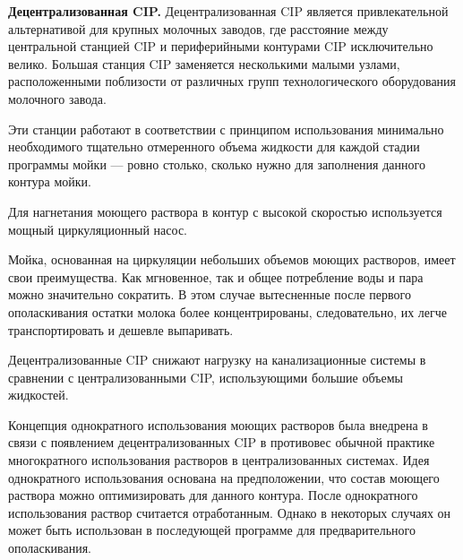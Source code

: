 {\par \redline \textbf{Децентрализованная CIP.} Децентрализованная CIP является привлекательной альтернативой для крупных молочных заводов, где расстояние между центральной станцией CIP и периферийными контурами CIP исключительно велико. Большая станция CIP заменяется несколькими малыми узлами, расположенными поблизости от различных групп технологического оборудования молочного завода.

\par \redline Эти станции работают в соответствии с принципом использования минимально необходимого тщательно отмеренного объема жидкости для каждой стадии программы мойки — ровно столько, сколько нужно для заполнения данного контура мойки.

\par \redline Для нагнетания моющего раствора в контур с высокой скоростью используется мощный циркуляционный насос.

\par \redline Мойка, основанная на циркуляции небольших объемов моющих растворов, имеет свои преимущества. Как мгновенное, так и общее потребление воды и пара можно значительно сократить. В этом случае вытесненные после первого ополаскивания остатки молока более концентрированы, следовательно, их легче транспортировать и дешевле выпаривать. 

\par \redline Децентрализованные CIP снижают нагрузку на канализационные системы в сравнении с централизованными CIP, использующими большие объемы жидкостей.

\par \redline Концепция однократного использования моющих растворов была внедрена в связи с появлением децентрализованных CIP в противовес обычной практике многократного использования растворов в централизованных системах. Идея однократного использования основана на предположении, что состав моющего раствора можно оптимизировать для данного контура. После однократного использования раствор считается отработанным. Однако в некоторых случаях он может быть использован в последующей программе для предварительного ополаскивания.

}
